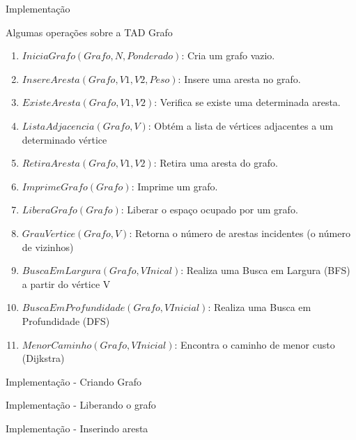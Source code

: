 \documentclass{if-beamer}
\begin{document}
\begin{frame}{Implementação}
	
	
\end{frame}

\begin{frame}{Algumas operações sobre a TAD Grafo}
	\begin{enumerate}
		\item $IniciaGrafo(Grafo, N, Ponderado)$: Cria um grafo vazio. 
		\item $InsereAresta(Grafo, V1, V2, Peso)$: Insere uma aresta no grafo. 
		\item $ExisteAresta(Grafo, V1, V2)$: Verifica se existe uma determinada aresta.
		\item $ListaAdjacencia(Grafo, V)$: Obtém a lista de vértices adjacentes a um determinado vértice 
		\item $RetiraAresta(Grafo, V1, V2)$: Retira uma aresta do grafo.
		\item $ImprimeGrafo(Grafo)$: Imprime um grafo. 
		\item $LiberaGrafo(Grafo)$: Liberar o espaço ocupado por um grafo. 
		\item $GrauVertice(Grafo, V)$: Retorna o número de arestas incidentes (o número de vizinhos)
		\item $BuscaEmLargura(Grafo, VInical)$: Realiza uma Busca em Largura (BFS) a partir do vértice V
		\item $BuscaEmProfundidade(Grafo, VInicial)$: Realiza uma Busca em Profundidade (DFS)
		\item $MenorCaminho(Grafo, VInicial)$: Encontra o caminho de menor custo (Dijkstra)
	\end{enumerate}
		
		
\end{frame}

\begin{frame}{Implementação - Criando Grafo}
		
	
\end{frame}


\begin{frame}{Implementação - Liberando o grafo}
		
	
\end{frame}

\begin{frame}{Implementação - Inserindo aresta}
		
	
\end{frame}
\end{document}
